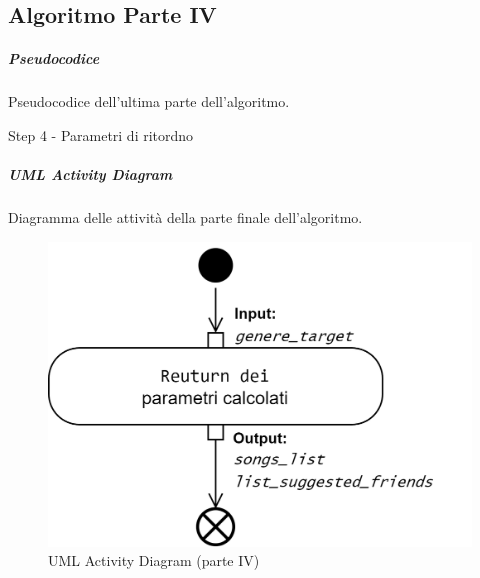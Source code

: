 \newpage
\subsection{Algoritmo Parte IV}

\subparagraph{Pseudocodice}
Pseudocodice dell'ultima parte dell'algoritmo.  

\begin{algorithm}

    \caption{Step 4 - Parametri di ritordno}
    \SetAlgoLined
   
\end{algorithm}
\vspace{1cm}
\subparagraph{UML Activity Diagram}
Diagramma delle attività della parte finale dell'algoritmo.
\vspace{0.3cm}
\begin{figure} [H]
    \centering
    \includegraphics[scale=0.8]{images/flowchart_4_UML.png}
    \caption{UML Activity Diagram (parte IV)}
    \label{fig-uml-ac-4}
\end{figure}




